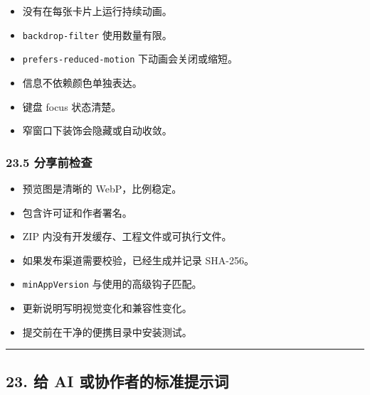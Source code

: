 \documentclass[UTF8,11pt,a4paper]{ctexart}
\providecommand{\tightlist}{%
  \setlength{\itemsep}{0pt}\setlength{\parskip}{0pt}}
\begin{document}
\begin{itemize}
\tightlist
\item[$\square$]
  没有在每张卡片上运行持续动画。
\item[$\square$]
  \texttt{backdrop-filter} 使用数量有限。
\item[$\square$]
  \texttt{prefers-reduced-motion} 下动画会关闭或缩短。
\item[$\square$]
  信息不依赖颜色单独表达。
\item[$\square$]
  键盘 focus 状态清楚。
\item[$\square$]
  窄窗口下装饰会隐藏或自动收敛。
\end{itemize}

\subsubsection{23.5
分享前检查}\label{235-ux5206ux4eabux524dux68c0ux67e5}

\begin{itemize}
\tightlist
\item[$\square$]
  预览图是清晰的 WebP，比例稳定。
\item[$\square$]
  包含许可证和作者署名。
\item[$\square$]
  ZIP 内没有开发缓存、工程文件或可执行文件。
\item[$\square$]
  如果发布渠道需要校验，已经生成并记录 SHA-256。
\item[$\square$]
  \texttt{minAppVersion} 与使用的高级钩子匹配。
\item[$\square$]
  更新说明写明视觉变化和兼容性变化。
\item[$\square$]
  提交前在干净的便携目录中安装测试。
\end{itemize}

\begin{center}\rule{0.5\linewidth}{0.5pt}\end{center}

\subsection{23. 给 AI
或协作者的标准提示词}\label{23-ux7ed9-ai-ux6216ux534fux4f5cux8005ux7684ux6807ux51c6ux63d0ux793aux8bcd}
\end{document}
